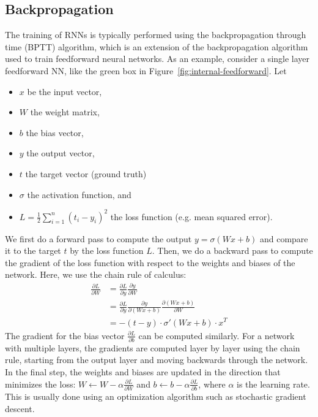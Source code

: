 \documentclass{article}
\newcommand{\reffig}[1]{Figure~\ref{#1}}
\begin{document}
\subsection{Backpropagation}
\label{sec:2.2}

The training of RNNs is typically performed using the backpropagation through time (BPTT)
algorithm, which is an extension of the backpropagation algorithm used to train
feedforward neural networks. As an example, consider a single layer feedforward NN, like
the green box in \reffig{fig:internal-feedforward}. Let
\begin{itemize}
  \item $x$ be the input vector,
  \item $W$ the weight matrix,
  \item $b$ the bias vector,
  \item $y$ the output vector,
  \item $t$ the target vector (ground truth)
  \item $\sigma$ the activation function, and
  \item $L = \frac{1}{2} \sum_{i=1}^{n} (t_i - y_i)^2$ the loss function (e.g. mean
        squared error).
\end{itemize}
We first do a forward pass to compute the output $y = \sigma(Wx + b)$ and compare it to
the target $t$ by the loss function $L$. Then, we do a backward pass to compute the
gradient of the loss function with respect to the weights and biases of the network. Here,
we use the chain rule of calculus:
\begin{align}
  \frac{\partial L}{\partial W} & = \frac{\partial L}{\partial y} \frac{\partial y}{\partial W}                                             \\
                                & = \frac{\partial L}{\partial y} \frac{\partial y}{\partial (Wx + b)} \frac{\partial (Wx + b)}{\partial W} \\
                                & = -(t-y) \cdot \sigma'(Wx + b) \cdot x^T
\end{align}
The gradient for the bias vector $\frac{\partial L}{\partial b}$ can be computed
similarly. For a network with multiple layers, the gradients are computed layer by layer
using the chain rule, starting from the output layer and moving backwards through the
network. In the final step, the weights and biases are updated in the direction that
minimizes the loss: $W \leftarrow W - \alpha \frac{\partial L}{\partial W}$ and $b
  \leftarrow b - \alpha \frac{\partial L}{\partial b}$, where $\alpha$ is the learning rate.
This is usually done using an optimization algorithm such as stochastic gradient descent.
\end{document}
